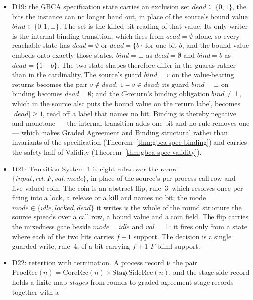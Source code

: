 \begin{itemize}
    The source blueprint carries a matching red annotation at those decide
    conditions.
  \item D19: the GBCA specification state carries an exclusion set
    $dead \subseteq \{0,1\}$, the bits the instance can no longer hand out, in
    place of the source's bound value $bind \in \{0,1,\bot\}$.
    The set is the killed-bit reading of that value.
    Its only writer is the internal binding transition, which fires from
    $dead = \emptyset$ alone, so every reachable state has $dead = \emptyset$ or
    $dead = \{b\}$ for one bit $b$, and the bound value embeds onto exactly
    those states, $bind = \bot$ as $dead = \emptyset$ and $bind = b$ as
    $dead = \{1-b\}$.
    The two state shapes therefore differ in the guards rather than in the
    cardinality.
    The source's guard $bind = v$ on the value-bearing returns becomes the pair
    $v \notin dead$, $1-v \in dead$; its guard $bind = \bot$ on binding becomes
    $dead = \emptyset$; and the $C$-return's binding obligation
    $bind \neq \bot$, which in the source also puts the bound value on the
    return label, becomes $|dead| \ge 1$, read off a label that names no bit.
    Binding is thereby negative and monotone --- the internal transition adds
    one bit and no rule removes one --- which makes Graded Agreement and Binding
    structural rather than invariants of the specification
    (Theorem~\ref{thm:gbca-spec-binding}) and carries the safety half of
    Validity (Theorem~\ref{thm:gbca-spec-validity}).
  \item D21: Transition System~1 is eight rules over the record
    $\{input, ret, F, val, mode\}$, in place of the source's per-process call
    row and five-valued coin.
    The coin is an abstract flip, rule~3, which resolves once per firing into a
    lock, a release or a kill and names no bit; the mode
    $mode \in \{idle, locked, dead\}$ it writes is the whole of the round
    structure the source spreads over a call row, a bound value and a coin
    field.
    The flip carries the mixedness gate beside $mode = idle$ and $val = \bot$:
    it fires only from a state where each of the two bits carries $f+1$
    support.
    The decision is a single guarded write, rule~4, of a bit carrying $f+1$
    $F$-blind support.
  \item D22: retention with termination.
    A process record is the pair $\mathrm{ProcRec}(n) = \mathrm{CoreRec}(n)
    \times \mathrm{StageSideRec}(n)$, and the stage-side record holds a finite
    map $stages$ from rounds to graded-agreement stage records together with a

\end{itemize}
